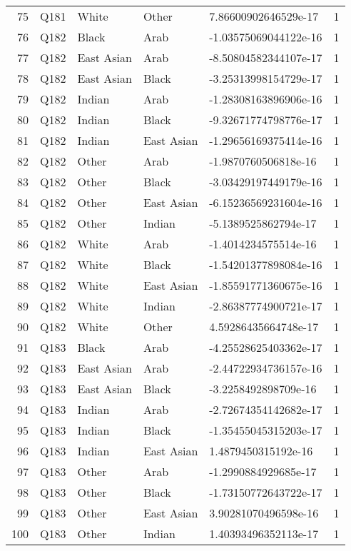 \documentclass{amsart}
\begin{document}
\begin{longtable}{rlllll}
  75 & Q181 & White & Other & 7.86600902646529e-17 & 1 \\ 
  76 & Q182 & Black & Arab & -1.03575069044122e-16 & 1 \\ 
  77 & Q182 & East Asian & Arab & -8.50804582344107e-17 & 1 \\ 
  78 & Q182 & East Asian & Black & -3.25313998154729e-17 & 1 \\ 
  79 & Q182 & Indian & Arab & -1.28308163896906e-16 & 1 \\ 
  80 & Q182 & Indian & Black & -9.32671774798776e-17 & 1 \\ 
  81 & Q182 & Indian & East Asian & -1.29656169375414e-16 & 1 \\ 
  82 & Q182 & Other & Arab & -1.9870760506818e-16 & 1 \\ 
  83 & Q182 & Other & Black & -3.03429197449179e-16 & 1 \\ 
  84 & Q182 & Other & East Asian & -6.15236569231604e-16 & 1 \\ 
  85 & Q182 & Other & Indian & -5.1389525862794e-17 & 1 \\ 
  86 & Q182 & White & Arab & -1.4014234575514e-16 & 1 \\ 
  87 & Q182 & White & Black & -1.54201377898084e-16 & 1 \\ 
  88 & Q182 & White & East Asian & -1.85591771360675e-16 & 1 \\ 
  89 & Q182 & White & Indian & -2.86387774900721e-17 & 1 \\ 
  90 & Q182 & White & Other & 4.59286435664748e-17 & 1 \\ 
  91 & Q183 & Black & Arab & -4.25528625403362e-17 & 1 \\ 
  92 & Q183 & East Asian & Arab & -2.44722934736157e-16 & 1 \\ 
  93 & Q183 & East Asian & Black & -3.2258492898709e-16 & 1 \\ 
  94 & Q183 & Indian & Arab & -2.72674354142682e-17 & 1 \\ 
  95 & Q183 & Indian & Black & -1.35455045315203e-17 & 1 \\ 
  96 & Q183 & Indian & East Asian & 1.4879450315192e-16 & 1 \\ 
  97 & Q183 & Other & Arab & -1.2990884929685e-17 & 1 \\ 
  98 & Q183 & Other & Black & -1.73150772643722e-17 & 1 \\ 
  99 & Q183 & Other & East Asian & 3.90281070496598e-16 & 1 \\ 
  100 & Q183 & Other & Indian & 1.40393496352113e-17 & 1 \\ 

\end{longtable}
\end{document}
